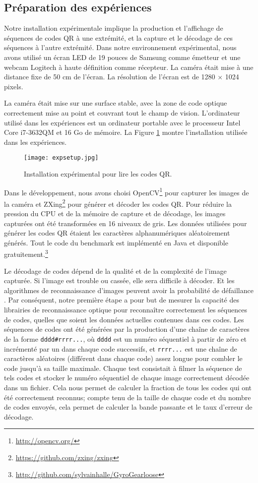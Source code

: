 \subsection{Préparation des expériences}

Notre installation expérimentale implique la production et l'affichage de séquences de codes QR à une extrémité, et la capture et le décodage de ces séquences à l'autre extrémité. Dans notre environnement expérimental, nous avons utilisé un écran LED de 19 pouces de Samsung comme émetteur et une webcam Logitech à haute définition comme récepteur. La caméra était mise à une distance fixe de 50 cm de l'écran. La résolution de l'écran est de 1280 $\times$ 1024 pixels.

La caméra était mise sur une surface stable, avec la zone de code optique correctement mise au point et couvrant tout le champ de vision. L'ordinateur utilisé dans les expériences est un ordinateur portable avec le processeur Intel Core i7-3632QM et 16 Go de mémoire. La Figure \ref{fig:qr:setup} montre l'installation utilisée dans les expériences.

\begin{figure}
\centering
\texttt{[image: expsetup.jpg]}
\caption{Installation expérimental pour lire les codes QR.}
\label{fig:qr:setup}
\end{figure}

Dans le développement, nous avons choisi OpenCV\footnote{\url{http://opencv.org/}} pour capturer les images de la caméra et ZXing\footnote{\url{https://github.com/zxing/zxing}} pour générer et décoder les codes QR. Pour réduire la pression du CPU et de la mémoire de capture et de décodage, les images capturées ont été transformées en 16 niveaux de gris. Les données utilisées pour générer les codes QR étaient les caractères alphanumériques aléatoirement générés. Tout le code du benchmark est implémenté en Java et disponible gratuitement.\footnote {\url{http://github.com/sylvainhalle/GyroGearloose}}

Le décodage de codes dépend de la qualité et de la complexité de l'image capturée. Si l'image est trouble ou cassée, elle sera difficile à décoder. Et les algorithmes de reconnaissance d'images peuvent avoir la probabilité de défaillance \citep{adel2006}. Par conséquent, notre première étape a pour but de mesurer la capacité des librairies de reconnaissance optique pour reconnaître correctement les séquences de codes, quelles que soient les données actuelles contenues dans ces codes. Les séquences de codes ont été générées par la production d'une chaîne de caractères de la forme \verb+dddd#rrrr...+, où \verb+dddd+ est un numéro séquentiel à partir de zéro et incrémenté par un dans chaque code successifs, et \verb+rrrr...+ est une chaîne de caractères aléatoires (différent dans chaque code) assez longue pour combler le code jusqu'à sa taille maximale. Chaque test consistait à filmer la séquence de tels codes et stocker le numéro séquentiel de chaque image correctement décodée dans un fichier. Cela nous permet de calculer la fraction de tous les codes qui ont été correctement reconnus; compte tenu de la taille de chaque code et du nombre de codes envoyés, cela permet de calculer la bande passante et le taux d'erreur de décodage.


